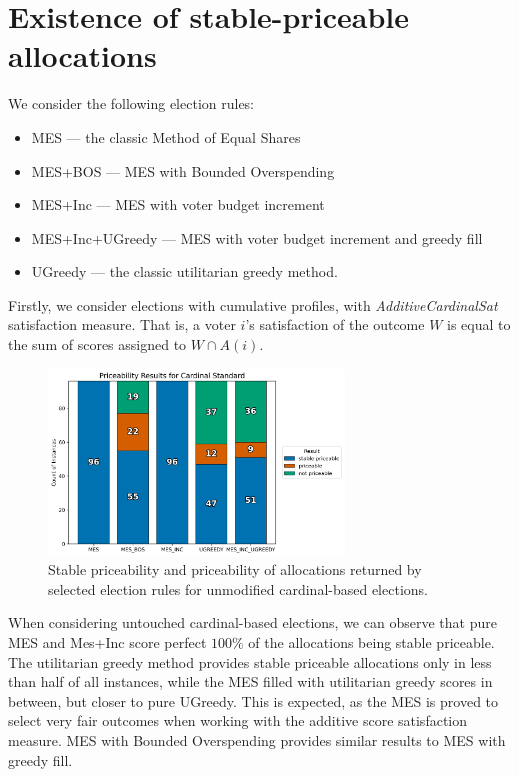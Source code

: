 \section{Existence of stable-priceable allocations}
We consider the following election rules:
\begin{itemize}
    \item MES --- the classic Method of Equal Shares
    \item MES+BOS --- MES with Bounded Overspending
    \item MES+Inc --- MES with voter budget increment
    \item MES+Inc+UGreedy --- MES with voter budget increment and greedy fill
    \item UGreedy --- the classic utilitarian greedy method.
\end{itemize}
Firstly, we consider elections with cumulative profiles, with \emph{AdditiveCardinalSat} satisfaction measure. That is, a voter $i$'s satisfaction of the outcome $W$ is equal to the sum of scores assigned to $W\cap A(i)$.
\begin{figure}[H]         
  \centering              
  \includegraphics[width=0.7\textwidth]{figures/plots/cardinal-standard/cardinal_standard_priceability.png}
  \caption{Stable priceability and priceability of allocations returned by selected election rules for unmodified cardinal-based elections.}
  \label{fig:myplot}
\end{figure}
When considering untouched cardinal-based elections, we can observe that pure MES and Mes+Inc score perfect $100\%$ of the allocations being stable priceable. The utilitarian greedy method provides stable priceable allocations only in less than half of all instances, while the MES filled with utilitarian greedy scores in between, but closer to pure UGreedy. This is expected, as the MES is proved to select very fair outcomes when working with the additive score satisfaction measure. MES with Bounded Overspending provides similar results to MES with greedy fill.


